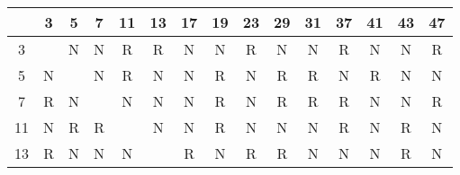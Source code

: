 \documentclass[17pt]{memoir}
\begin{document}
\arrayrulewidth=2pt
\begin{tabular}{c|cccccccccccccc}
   & 3                         & 5                         & 7                         & 11                        & 13                        & 17                        & 19                        & 23                        & 29                        & 31                        & 37                        & 41                        & 43                        & 47                        \\
\hline
3  & \cellcolor{black}         & N                         & N                         & \cellcolor[HTML]{FAC22B}R & \cellcolor[HTML]{FAC22B}R & N                         & N                         & \cellcolor[HTML]{FAC22B}R & N                         & N                         & \cellcolor[HTML]{FAC22B}R & N                         & N                         & \cellcolor[HTML]{FAC22B}R \\
5  & N                         & \cellcolor{black}         & N                         & \cellcolor[HTML]{FAC22B}R & N                         & N                         & \cellcolor[HTML]{FAC22B}R & N                         & \cellcolor[HTML]{FAC22B}R & \cellcolor[HTML]{FAC22B}R & N                         & \cellcolor[HTML]{FAC22B}R & N                         & N                         \\
7  & \cellcolor[HTML]{FAC22B}R & N                         & \cellcolor{black}         & N                         & N                         & N                         & \cellcolor[HTML]{FAC22B}R & N                         & \cellcolor[HTML]{FAC22B}R & \cellcolor[HTML]{FAC22B}R & \cellcolor[HTML]{FAC22B}R & N                         & N                         & \cellcolor[HTML]{FAC22B}R \\
11 & N                         & \cellcolor[HTML]{FAC22B}R & \cellcolor[HTML]{FAC22B}R & \cellcolor{black}         & N                         & N                         & \cellcolor[HTML]{FAC22B}R & N                         & N                         & N                         & \cellcolor[HTML]{FAC22B}R & N                         & \cellcolor[HTML]{FAC22B}R & N                         \\
13 & \cellcolor[HTML]{FAC22B}R & N                         & N                         & N                         & \cellcolor{black}         & \cellcolor[HTML]{FAC22B}R & N                         & \cellcolor[HTML]{FAC22B}R & \cellcolor[HTML]{FAC22B}R & N                         & N                         & N                         & \cellcolor[HTML]{FAC22B}R & N                         \\

\end{tabular}
\end{document}
